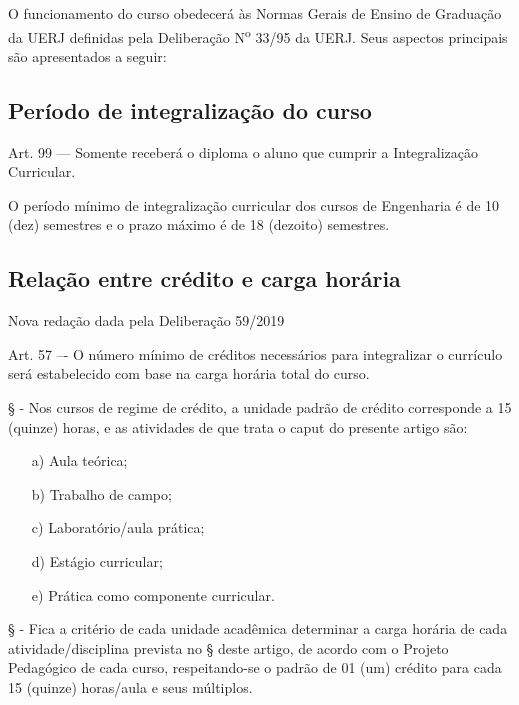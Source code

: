 O funcionamento do curso obedecerá às Normas Gerais de Ensino de Graduação da UERJ definidas pela Deliberação N\textsuperscript{o} 33/95 da UERJ. Seus aspectos principais são apresentados a seguir:

\subsection{Período de integralização do curso}
\begin{quoting}
    Art. 99 –-- Somente receberá o diploma o aluno que cumprir a Integralização Curricular.
\end{quoting}

O período mínimo de integralização curricular dos cursos de Engenharia é de 10 (dez) semestres e o prazo máximo é de 18 (dezoito) semestres.

\subsection{Relação entre crédito e carga horária}
Nova redação dada pela Deliberação  59/2019
\begin{quoting}
    Art. 57 –- O número mínimo de créditos necessários para integralizar o
    currículo será estabelecido com base na carga horária total do curso.


    \S {} - Nos cursos de regime de crédito, a unidade padrão de crédito
    corresponde a 15 (quinze) horas, e as atividades de que trata o caput do
    presente artigo são:
    \begin{itemize}
        \item[a)] Aula teórica;
        \item[b)] Trabalho de campo;
        \item[c)] Laboratório/aula prática;
        \item[d)] Estágio curricular;
        \item[e)] Prática como componente curricular.
    \end{itemize}

    \S {} - Fica a critério de cada unidade acadêmica determinar a carga horária de  cada atividade/disciplina prevista no \S{} deste artigo, de acordo com o Projeto Pedagógico de cada curso, respeitando-se o padrão de 01 (um) crédito para cada 15 (quinze) horas/aula e seus múltiplos.
\end{quoting}
